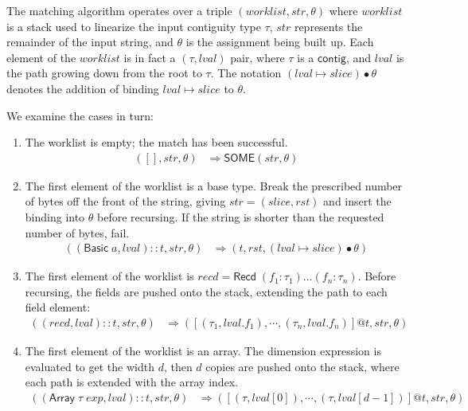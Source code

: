 \documentclass[svgnames]{llncs}
\newcommand{\konst}[1]{\ensuremath{\mathsf{#1}}}
\newcommand{\lval}{\ensuremath{\mathit{lval}}}
\begin{document}
\begin{definition}

The matching algorithm operates over a triple $(\mathit{worklist},
\mathit{str}, \theta)$ where $\mathit{worklist}$ is a stack used to
linearize the input contiguity type $\tau$, $\mathit{str}$ represents
the remainder of the input string, and $\theta$ is the assignment
being built up. Each element of the $\mathit{worklist}$ is in fact a
$(\tau,\mathit{lval})$ pair, where $\tau$ is a \konst{contig}, and
$\mathit{lval}$ is the path growing down from the root to $\tau$. The
notation $(\lval \mapsto \mathit{slice}) \bullet \theta$ denotes the
addition of binding $\lval \mapsto \mathit{slice}$ to $\theta$.

We examine the cases in turn:

\begin{enumerate}

\item The worklist is empty; the match has been successful.
%
\begin{align*}
([], \mathit{str}, \theta) &\Rightarrow \konst{SOME}(\mathit{str}, \theta)
\end{align*}


\item The first element of the worklist is a base type. Break the
  prescribed number of bytes off the front of the string, giving
  $\mathit{str} = (\mathit{slice},\mathit{rst})$ and insert the
  binding into $\theta$ before recursing. If the string is shorter
  than the requested number of bytes, fail.
%
\begin{align*}
((\konst{Basic}\;a, \lval)::t, \mathit{str}, \theta)
   &\Rightarrow
  (t,\mathit{rst}, (\lval \mapsto \mathit{slice}) \bullet \theta)
\end{align*}

\item The first element of the worklist is $\mathit{recd} =
  \konst{Recd}\;(f_1 : \tau_1) \ldots (f_n : \tau_n)$. Before
  recursing, the fields are pushed onto the stack, extending the path
  to each field element:
%
\begin{align*}
((\mathit{recd}, \lval)::t, \mathit{str}, \theta)
   &\Rightarrow
  ([(\tau_1,\lval.f_1), \cdots , (\tau_n,\lval.f_n)] @ t,\mathit{str}, \theta)
\end{align*}

\item The first element of the worklist is an array. The dimension
  expression is evaluated to get the width $d$, then $d$ copies are
  pushed onto the stack, where each path is extended with the array
  index.
%
\begin{align*}
((\konst{Array}\; \tau \; \mathit{exp},\lval)::t, \mathit{str}, \theta)
   &\Rightarrow
  ([(\tau,\lval[0]), \cdots , (\tau,\lval[d-1])] @ t,\mathit{str}, \theta)
\end{align*}


\end{enumerate}
\end{definition}
\end{document}
